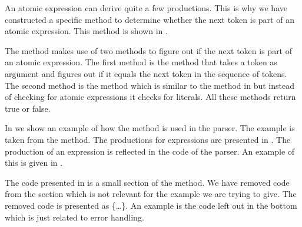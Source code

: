 
An atomic expression can derive quite a few productions. This is why we have
constructed a specific method to determine whether the next token is part of an
atomic expression. This method is shown in .



The method  makes use of two methods to figure out if
the next token is part of an atomic expression. The first method is the
 method that takes a token as argument and figures out if it equals 
the next token in the sequence of tokens. The second
method is the  method which is similar to the method 
in  but instead of checking for atomic expressions it 
checks for literals. All these methods return true or false.

In  we show an example of how the
 method is used in the parser. The example is taken from
the  method. The productions for expressions are presented
in .
The production of an expression is reflected in the code of the parser. An
example of this is given in .




The code presented in  is a small section of the
 method. We have removed code from the section which is
not relevant for the example we are trying to give. The removed code is
presented as \{\ldots\}. An example is the code left out in the bottom which is 
just related to error handling.

